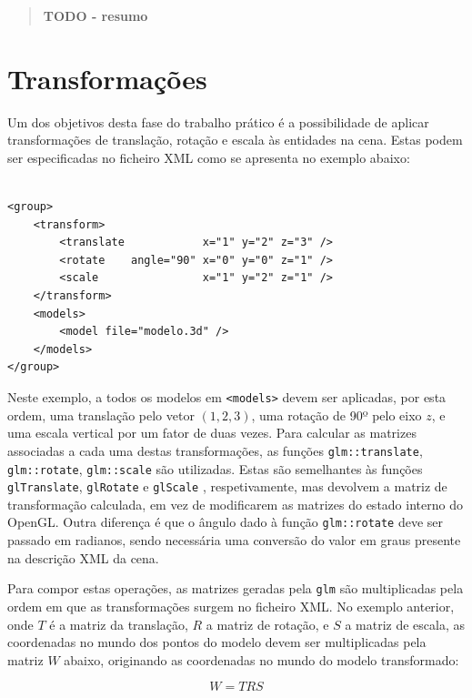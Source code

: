 \documentclass[12pt, a4paper]{article}
\begin{document}
\pagebreak

\begin{abstract}
    \textbf{\color{red} TODO - resumo}
\end{abstract}

\section{Transformações}

Um dos objetivos desta fase do trabalho prático é a possibilidade de aplicar transformações de
translação, rotação e escala às entidades na cena. Estas podem ser especificadas no ficheiro XML
como se apresenta no exemplo abaixo:

\lstset{language=xml}
\begin{lstlisting}

<group>
    <transform>
		<translate            x="1" y="2" z="3" />
        <rotate    angle="90" x="0" y="0" z="1" />
		<scale                x="1" y="2" z="1" />
    </transform>
    <models>
        <model file="modelo.3d" />
    </models>
</group>
\end{lstlisting}

Neste exemplo, a todos os modelos em \texttt{<models>} devem ser aplicadas, por esta ordem, uma
translação pelo vetor $(1, 2, 3)$, uma rotação de 90º pelo eixo $z$, e uma escala vertical por um
fator de duas vezes. Para calcular as matrizes associadas a cada uma destas transformações, as
funções \texttt{glm::translate}, \texttt{glm::rotate}, \texttt{glm::scale} são utilizadas.
\cite{glm-transform} Estas são semelhantes às funções \texttt{glTranslate}, \texttt{glRotate} e
\texttt{glScale} \cite{gl-transforms}, respetivamente, mas devolvem a matriz de transformação
calculada, em vez de modificarem as matrizes do estado interno do OpenGL. Outra diferença é que o
ângulo dado à função \texttt{glm::rotate} deve ser passado em radianos, sendo necessária uma
conversão do valor em graus presente na descrição XML da cena.

Para compor estas operações, as matrizes geradas pela \texttt{glm} são multiplicadas pela ordem em
que as transformações surgem no ficheiro XML. No exemplo anterior, onde $T$ é a matriz da
translação, $R$ a matriz de rotação, e $S$ a matriz de escala, as coordenadas no mundo dos pontos do
modelo devem ser multiplicadas pela matriz $W$ abaixo, originando as coordenadas no mundo do modelo
transformado:

$$
W = T R S
$$
\end{document}
